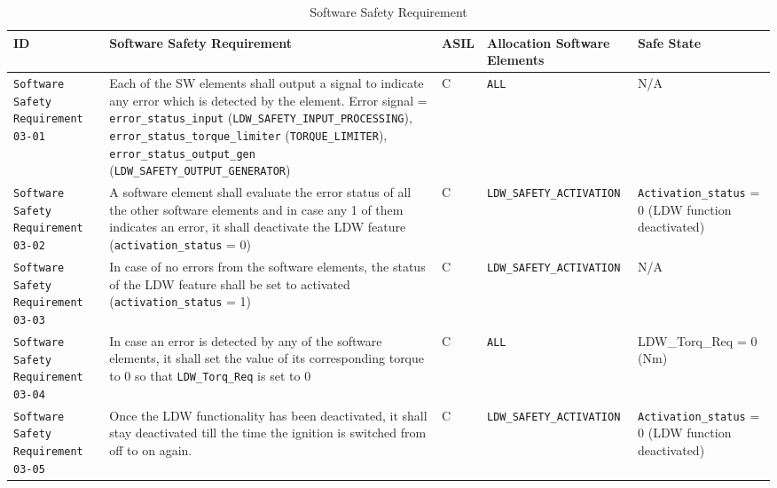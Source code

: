 \begin{table}[!htpb]
\caption{Software Safety Requirement}
\begin{center}
\scriptsize
\renewcommand{\arraystretch}{1.4}
\hspace*{-2.0cm}
\begin{tabular}{ L{1.7cm}|L{5.2cm}|L{0.5cm}|L{5.2cm}|L{3.0cm}  }
\hline
{}
ID &
Software Safety Requirement  &
ASIL &
Allocation Software Elements  &  
Safe State \\\hline
\textcolor{harmonia-blue}{\texttt{Software Safety Requirement 03-01}}  &
Each of the SW elements shall output a signal to indicate any error which is
detected by the element. Error signal =
\textcolor{dark-red}{\texttt{error\_status\_input}} (\textcolor{dark-red}{\texttt{LDW\_SAFETY\_INPUT\_PROCESSING}}),
\textcolor{dark-red}{\texttt{error\_status\_torque\_limiter}} (\textcolor{dark-red}{\texttt{TORQUE\_LIMITER}}),
\textcolor{dark-red}{\texttt{error\_status\_output\_gen}} (\textcolor{dark-red}{\texttt{LDW\_SAFETY\_OUTPUT\_GENERATOR}})
&
C &
\texttt{ALL}  &
N/A
\\\hline
\textcolor{harmonia-blue}{\texttt{Software Safety Requirement 03-02}}  &
A software element shall evaluate the error status of all the other software
elements and in case any 1 of them indicates an error, it shall deactivate
the LDW feature (\textcolor{dark-red}{\texttt{activation\_status}} = 0)
 &
C &
\texttt{LDW\_SAFETY\_ACTIVATION}  &
\texttt{Activation\_status} = 0 (LDW function deactivated)
\\\hline
\textcolor{harmonia-blue}{\texttt{Software Safety Requirement 03-03}}  &
In case of no errors from the software elements, the status of the LDW feature
shall be set to activated (\textcolor{dark-red}{\texttt{activation\_status}} = 1)
&
C &
\texttt{LDW\_SAFETY\_ACTIVATION}  &
N/A
\\\hline
\textcolor{harmonia-blue}{\texttt{Software Safety Requirement 03-04}}  &
In case an error is detected by any of the software elements, it shall set the
value of its corresponding torque to 0 so that 
\textcolor{dark-red}{\texttt{LDW\_Torq\_Req}} is set to 0
&
C &
\texttt{ALL}  &
LDW\_Torq\_Req = 0 (Nm)
\\\hline
\textcolor{harmonia-blue}{\texttt{Software Safety Requirement 03-05}}  &
Once the LDW functionality has been deactivated, it shall stay deactivated till
the time the ignition is switched from off to on again.
&
C &
\texttt{LDW\_SAFETY\_ACTIVATION}  &
\texttt{Activation\_status} = 0 (LDW function deactivated)
\\\hline
\end{tabular}
\end{center}
\label{tab:sr03}
\end{table}



